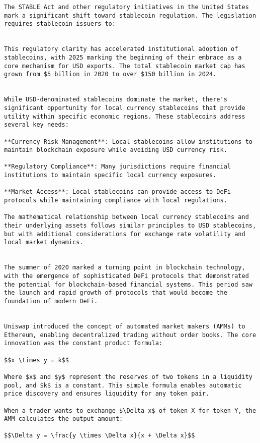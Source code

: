 \documentclass[12pt]{article}
\begin{document}
{{{\begin{itemize}
\begin{lstlisting}
The STABLE Act and other regulatory initiatives in the United States mark a significant shift toward stablecoin regulation. The legislation requires stablecoin issuers to:


This regulatory clarity has accelerated institutional adoption of stablecoins, with 2025 marking the beginning of their embrace as a core mechanism for USD exports. The total stablecoin market cap has grown from $5 billion in 2020 to over $150 billion in 2024.


While USD-denominated stablecoins dominate the market, there's significant opportunity for local currency stablecoins that provide utility within specific economic regions. These stablecoins address several key needs:

**Currency Risk Management**: Local stablecoins allow institutions to maintain blockchain exposure while avoiding USD currency risk.

**Regulatory Compliance**: Many jurisdictions require financial institutions to maintain specific local currency exposures.

**Market Access**: Local stablecoins can provide access to DeFi protocols while maintaining compliance with local regulations.

The mathematical relationship between local currency stablecoins and their underlying assets follows similar principles to USD stablecoins, but with additional considerations for exchange rate volatility and local market dynamics.


The summer of 2020 marked a turning point in blockchain technology, with the emergence of sophisticated DeFi protocols that demonstrated the potential for blockchain-based financial systems. This period saw the launch and rapid growth of protocols that would become the foundation of modern DeFi.


Uniswap introduced the concept of automated market makers (AMMs) to Ethereum, enabling decentralized trading without order books. The core innovation was the constant product formula:

$$x \times y = k$$

Where $x$ and $y$ represent the reserves of two tokens in a liquidity pool, and $k$ is a constant. This simple formula enables automatic price discovery and ensures liquidity for any token pair.

When a trader wants to exchange $\Delta x$ of token X for token Y, the AMM calculates the output amount:

$$\Delta y = \frac{y \times \Delta x}{x + \Delta x}$$


\end{lstlisting}
\end{itemize}}}}
\end{document}
